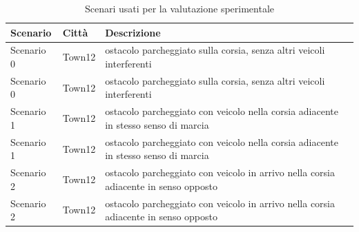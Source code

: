 \begin{table}[H]
    \centering
    \caption{Scenari usati per la valutazione sperimentale}
    \begin{tabular}{p{}p{}p{}}
        \toprule
        \textbf{Scenario} & \textbf{Città} & \textbf{Descrizione} \\
        \midrule
        Scenario 0 & Town12 & ostacolo parcheggiato sulla corsia, senza altri veicoli interferenti \\
        Scenario 0 & Town12 & ostacolo parcheggiato sulla corsia, senza altri veicoli interferenti \\
        Scenario 1 & Town12 & ostacolo parcheggiato con veicolo nella corsia adiacente in stesso senso di marcia \\
        Scenario 1 & Town12 & ostacolo parcheggiato con veicolo nella corsia adiacente in stesso senso di marcia \\
        Scenario 2 & Town12 & ostacolo parcheggiato con veicolo in arrivo nella corsia adiacente in senso opposto \\
        Scenario 2 & Town12 & ostacolo parcheggiato con veicolo in arrivo nella corsia adiacente in senso opposto \\
        \bottomrule
    \end{tabular}
\end{table}
